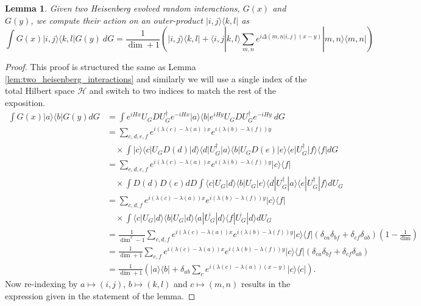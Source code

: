\documentclass[
 amsmath,amssymb,
 aps,
onecolumn, 
nofootinbib]{revtex4-2}
\newtheorem{lemma}[theorem]{Lemma}
\newcommand{\ket}[1]{|#1\rangle}
\newcommand{\bra}[1]{\langle #1|}
\newcommand{\braket}[2]{\langle #1|#2\rangle}
\newcommand{\ketbra}[2]{| #1\rangle\! \langle #2|}
\newcommand{\parens}[1]{\left( #1 \right)}
\newcommand{\hilb}{\mathcal{H}}
\begin{document}
\begin{lemma} \label{lem:sandwiched_interaction}
    Given two Heisenberg evolved random interactions, $G(x)$ and $G(y)$, we compute their action on an outer-product $\ketbra{i,j}{k,l}$ as
    \begin{equation}
        \int G(x) \ketbra{i,j}{k,l} G(y) ~dG = \frac{1}{\dim + 1} \parens{\ketbra{i,j}{k,l} + \braket{i,j}{k,l} \sum_{m,n} e^{i \Delta(m,n | i,j) (x-y)} \ketbra{m,n}{m,n}}
    \end{equation}
\end{lemma}
\begin{proof}
This proof is structured the same as Lemma \ref{lem:two_heisenberg_interactions} and similarly we will use a single index of the total Hilbert space $\hilb$ and switch to two indices to match the rest of the exposition.
    \begin{align}
        \int G(x) \ketbra{a}{b} G(y) dG &=  \int e^{i H x} U_G D U_G^{\dagger} e^{-i H x} \ketbra{a}{b} e^{i H y} U_G D U_G^\dagger e^{-i H y} ~dG \\
        &= \sum_{c, d, e, f} e^{i (\lambda(c) - \lambda(a))x} e^{i (\lambda(b) - \lambda(f))y} \nonumber \\
        &\quad \times \int \ketbra{c}{c} U_G D(d) \ketbra{d}{d} U_G^\dagger \ketbra{a}{b} U_G D(e) \ketbra{e}{e} U_G^\dagger \ketbra{f}{f} dG \\
        &= \sum_{c, d, e, f}  e^{i (\lambda(c) - \lambda(a))x} e^{i (\lambda(b) - \lambda(f))y} \ketbra{c}{f} \nonumber \\
        &\quad \times \int D(d) D(e) dD \int \bra{c} U_G \ket{d} \bra{b} U_G \ket{e} \bra{d} U_G^\dagger \ket{a} \bra{e} U_G^\dagger \ket{f} dU_G \\
        &=  \sum_{c,d,f} e^{i (\lambda(c) - \lambda(a))x} e^{i (\lambda(b) - \lambda(f))y} \ketbra{c}{f} \nonumber \\ 
        &\quad \times \int \bra{c} U_G \ket{d} \bra{b} U_G \ket{d} \bra{a} \overline{U_G} \ket{d} \bra{f} \overline{U_G} \ket{d} dU_G \\
        &= \frac{1}{\dim^2 - 1} \sum_{c,d,f} e^{i (\lambda(c) - \lambda(a))x} e^{i (\lambda(b) - \lambda(f))y} \ketbra{c}{f} (\delta_{ca} \delta_{bf} + \delta_{cf}\delta_{ab})\parens{1 - \frac{1}{\dim}} \\
        &= \frac{1}{\dim + 1} \sum_{c,f} e^{i (\lambda(c) - \lambda(a))x} e^{i (\lambda(b) - \lambda(f))y} \ketbra{c}{f} (\delta_{ca} \delta_{bf} + \delta_{cf}\delta_{ab}) \\
        &= \frac{1}{\dim + 1} \parens{\ketbra{a}{b} + \delta_{ab} \sum_{c} e^{i(\lambda(c) - \lambda(a))(x-y)} \ketbra{c}{c} }.
    \end{align}
    Now re-indexing by $a \mapsto (i,j)$, $b \mapsto (k,l)$ and $c \mapsto (m,n)$ results in the expression given in the statement of the lemma.
\end{proof}
\end{document}
